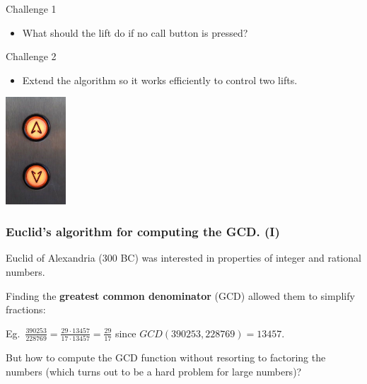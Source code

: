 \documentclass{beamer} %
\newcommand\emc[1]{\textcolor{midred}{\textbf{#1}}}
\begin{document}
  
\begin{frame}
  \begin{block}{Challenge 1}
    \begin{itemize}
    \item What should the lift do if no call button is pressed?
    \end{itemize}
  \end{block}
  \centering
  \begin{block}{Challenge 2}
    \begin{itemize}
    \item Extend the algorithm so it works efficiently to control two lifts.
    \end{itemize}
  \end{block}
  \centering
  \includegraphics[height=40mm]{img/elevator.jpg}
\end{frame}



\begin{frame}
\frametitle{Euclid's algorithm for computing the GCD. (I)} 

Euclid of Alexandria (300 BC) was interested in properties of integer and rational numbers. 

\vspace{5mm}
Finding the \emc{greatest common denominator} (GCD) allowed them to simplify fractions:

\vspace{5mm}
Eg.\ $\frac{390253}{228769} = \frac{29 \cdot 13457}{17 \cdot 13457} = \frac{29}{17}$ since $GCD(390253, 228769) = 13457$.

\vspace{5mm}
But how to compute the GCD function without resorting to factoring the numbers (which turns out to be a hard problem for large numbers)?

\end{frame}
\end{document}
